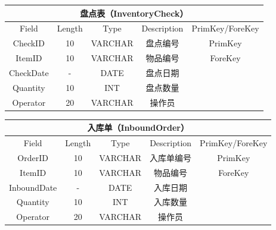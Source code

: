 \documentclass[12pt,a4paper]{article}
\begin{document}
\begin{table}[h]
    \centering
    \begin{tabular}{|c|c|c|c|c|} 
     \hline
     \multicolumn{5}{|c|}{盘点表（InventoryCheck）}\\
     \hline
        Field       & Length & Type    & Description      & PrimKey/ForeKey \\ \hline
        CheckID     & 10     & VARCHAR & 盘点编号          & PrimKey         \\ \hline
        ItemID      & 10     & VARCHAR & 物品编号          & ForeKey         \\ \hline
        CheckDate   & -      & DATE    & 盘点日期          &                 \\ \hline
        Quantity    & 10     & INT     & 盘点数量          &                 \\ \hline
        Operator    & 20     & VARCHAR & 操作员            &                 \\ \hline
    \end{tabular}
    \label{table:2}
\end{table}


\begin{table}[h]
    \centering
    \begin{tabular}{|c|c|c|c|c|} 
     \hline
     \multicolumn{5}{|c|}{入库单（InboundOrder）}\\
        \hline
        Field       & Length & Type    & Description      & PrimKey/ForeKey \\ \hline
        OrderID     & 10     & VARCHAR & 入库单编号        & PrimKey         \\ \hline
        ItemID      & 10     & VARCHAR & 物品编号          & ForeKey         \\ \hline
        InboundDate & -      & DATE    & 入库日期          &                 \\ \hline
        Quantity    & 10     & INT     & 入库数量          &                 \\ \hline
        Operator    & 20     & VARCHAR & 操作员            &                 \\ \hline
        \end{tabular}
    \label{table:3}
\end{table}
\end{document}
